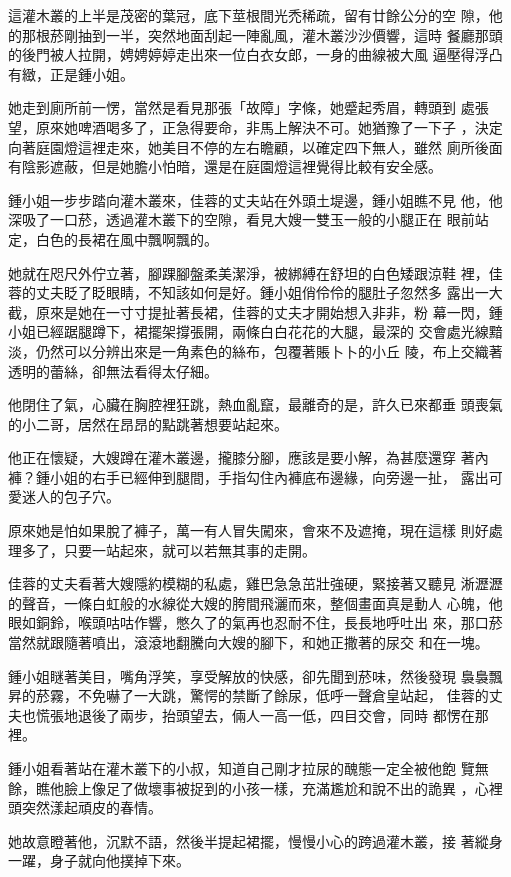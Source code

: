 這灌木叢的上半是茂密的葉冠，底下莖根間光禿稀疏，留有廿餘公分的空
隙，他的那根菸剛抽到一半，突然地面刮起一陣亂風，灌木叢沙沙價響，這時
餐廳那頭的後門被人拉開，娉娉婷婷走出來一位白衣女郎，一身的曲線被大風
逼壓得浮凸有緻，正是鍾小姐。

她走到廁所前一愣，當然是看見那張「故障」字條，她蹙起秀眉，轉頭到
處張望，原來她啤酒喝多了，正急得要命，非馬上解決不可。她猶豫了一下子
，決定向著庭園燈這裡走來，她美目不停的左右瞻顧，以確定四下無人，雖然
廁所後面有陰影遮蔽，但是她膽小怕暗，還是在庭園燈這裡覺得比較有安全感。

鍾小姐一步步踏向灌木叢來，佳蓉的丈夫站在外頭土堤邊，鍾小姐瞧不見
他，他深吸了一口菸，透過灌木叢下的空隙，看見大嫂一雙玉一般的小腿正在
眼前站定，白色的長裙在風中飄啊飄的。

她就在咫尺外佇立著，腳踝腳盤柔美潔淨，被綁縛在舒坦的白色矮跟涼鞋
裡，佳蓉的丈夫眨了眨眼睛，不知該如何是好。鍾小姐俏伶伶的腿肚子忽然多
露出一大截，原來是她在一寸寸提扯著長裙，佳蓉的丈夫才開始想入非非，粉
幕一閃，鍾小姐已經踞腿蹲下，裙擺架撐張開，兩條白白花花的大腿，最深的
交會處光線黯淡，仍然可以分辨出來是一角素色的絲布，包覆著賬卜卜的小丘
陵，布上交織著透明的蕾絲，卻無法看得太仔細。

他閉住了氣，心臟在胸腔裡狂跳，熱血亂竄，最離奇的是，許久已來都垂
頭喪氣的小二哥，居然在昂昂的點跳著想要站起來。

他正在懷疑，大嫂蹲在灌木叢邊，攏膝分腳，應該是要小解，為甚麼還穿
著內褲？鍾小姐的右手已經伸到腿間，手指勾住內褲底布邊緣，向旁邊一扯，
露出可愛迷人的包子穴。

原來她是怕如果脫了褲子，萬一有人冒失闖來，會來不及遮掩，現在這樣
則好處理多了，只要一站起來，就可以若無其事的走開。

佳蓉的丈夫看著大嫂隱約模糊的私處，雞巴急急茁壯強硬，緊接著又聽見
淅瀝瀝的聲音，一條白虹般的水線從大嫂的胯間飛灑而來，整個畫面真是動人
心魄，他眼如銅鈴，喉頭咕咕作響，憋久了的氣再也忍耐不住，長長地呼吐出
來，那口菸當然就跟隨著噴出，滾滾地翻騰向大嫂的腳下，和她正撒著的尿交
和在一塊。

鍾小姐瞇著美目，嘴角浮笑，享受解放的快感，卻先聞到菸味，然後發現
裊裊飄昇的菸霧，不免嚇了一大跳，驚愕的禁斷了餘尿，低呼一聲倉皇站起，
佳蓉的丈夫也慌張地退後了兩步，抬頭望去，倆人一高一低，四目交會，同時
都愣在那裡。

鍾小姐看著站在灌木叢下的小叔，知道自己剛才拉尿的醜態一定全被他飽
覽無餘，瞧他臉上像足了做壞事被捉到的小孩一樣，充滿尷尬和說不出的詭異
，心裡頭突然漾起頑皮的春情。

她故意瞪著他，沉默不語，然後半提起裙擺，慢慢小心的跨過灌木叢，接
著縱身一躍，身子就向他撲掉下來。

